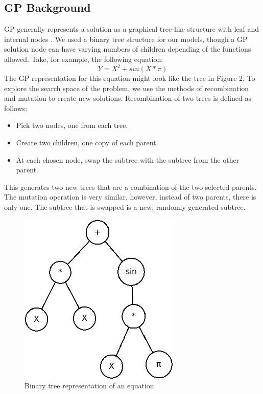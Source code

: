 \documentclass{IEEEtran}
\begin{document}
\subsection{GP Background}
GP generally represents a solution as a graphical tree-like structure with leaf and internal nodes \cite{b2}. We used a binary tree structure for our models, though a GP solution node can have varying numbers of children depending of the functions allowed. Take, for example, the following equation: 
\begin{equation}
Y = X^2 + sin(X*\pi)
\end{equation}
The GP representation for this equation might look like the tree in Figure 2. To explore the search space of the problem, we use the methods of recombination and mutation to create new solutions. Recombination of two trees is defined as follows:
\begin{itemize}
\item Pick two nodes, one from each tree.
\item Create two children, one copy of each parent.
\item At each chosen node, swap the subtree with the subtree from the other parent.
\end{itemize}
This generates two new trees that are a combination of the two selected parents. The mutation operation is very similar, however, instead of two parents, there is only one. The subtree that is swapped is a new, randomly generated subtree.

\begin{figure}[!t]
\centerline{\includegraphics[width=\columnwidth]{functionmodel.png}}
\caption{Binary tree representation of an equation}
\end{figure}
\end{document}

